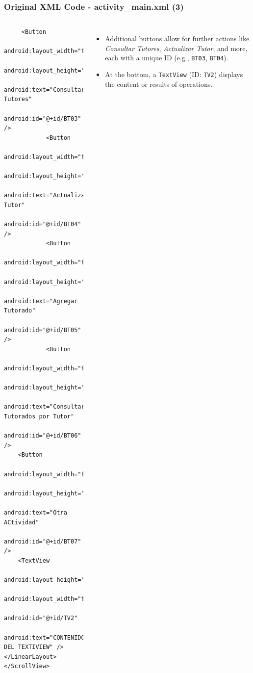 \documentclass[pdf,
serif,
compress,
xcolor=table,
dvipsnames,
spanish,
aspectratio=169]{beamer}
\begin{document}
\begin{frame}[fragile]
    \frametitle{Original XML Code - activity\_main.xml (3)}    


\begin{columns}
    \begin{verbatim}
     <Button
	            android:layout_width="fill_parent"
	            android:layout_height="fill_parent"
	            android:text="Consultar Tutores"
	            android:id="@+id/BT03"   />	        	        
	        <Button
	            android:layout_width="fill_parent"
	            android:layout_height="fill_parent"
	            android:text="Actualizar Tutor"
	            android:id="@+id/BT04"   />
	        <Button
	            android:layout_width="fill_parent"
	            android:layout_height="fill_parent"
	            android:text="Agregar Tutorado"
	            android:id="@+id/BT05"   />	        	        
	        <Button
	            android:layout_width="fill_parent"
	            android:layout_height="fill_parent"
	            android:text="Consultar Tutorados por Tutor"
	            android:id="@+id/BT06"   />
	<Button
		android:layout_width="fill_parent"
		android:layout_height="fill_parent"
		android:text="Otra ACtividad"
		android:id="@+id/BT07"   />
	<TextView
        android:layout_height="wrap_content"
        android:layout_width="fill_parent"
        android:id="@+id/TV2"
        android:text="CONTENIDO DEL TEXTIVIEW" />        
</LinearLayout>
</ScrollView>

    \end{verbatim}
\begin{itemize}\tiny
        \item Additional buttons allow for further actions like \emph{Consultar Tutores}, \emph{Actualizar Tutor}, and more, each with a unique ID (e.g., \texttt{BT03}, \texttt{BT04}).
        \item At the bottom, a \texttt{TextView} (ID: \texttt{TV2}) displays the content or results of operations.
    \end{itemize}
\end{columns}  
\end{frame}

\end{document}
